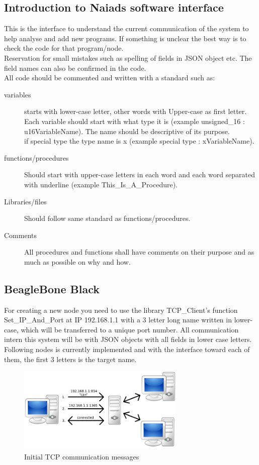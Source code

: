 \subsection{Introduction to Naiads software interface}
\noindent This is the interface to understand the current communication of the system to help analyse and add new programs. If something is unclear the best way is to check the code for that program/node.\\ Reservation for small mistakes such as spelling of fields in JSON object etc. The field names can also be confirmed in the code.\\
All code should be commented and written with a standard such as:
\begin{description}
  \item[variables] starts with lower-case letter, other words with Upper-case as first letter. Each variable should start with what type it is (example unsigned_16 : u16VariableName). The name should be descriptive of its purpose.
  \\if special type the type name is x (example special type : xVariableName).
  \item[functions/procedures] Should start with upper-case letters in each word and each word separated with underline (example This_Is_A_Procedure).
  \item[Libraries/files] Should follow same standard as functions/procedures.
  \item[Comments] All procedures and functions shall have comments on their purpose and as much as possible on why and how.
\end{description}

\subsection{BeagleBone Black}
\noindent For creating a new node you need to use the library TCP_Client's function Set_IP_And_Port at IP 192.168.1.1 with a 3 letter long name written in lower-case, which will be transferred to a unique port number.
All communication intern this system will be with JSON objects with all fields in lower case letters.
Following nodes is currently implemented and with the interface toward each of them, the first 3 letters is the target name.


\begin{figure}[!ht]
	\begin{center}
		\includegraphics[width=80mm]{./Images/Software/tcp_init_connection.png}
		\caption{Initial TCP communication messages}
		\label{YourLabel}
	\end{center}
\end{figure}


